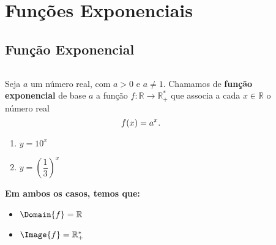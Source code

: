 \section{Funções Exponenciais}

\subsection{Função Exponencial}
\begin{frame}
  \begin{columns}[onlytextwidth]
    \begin{column}{0.49\textwidth}\vspace*{-0.5cm}
      \begin{definition}
        Seja $a$ um número real, com $a > 0$ e $a\not= 1$. Chamamos de \textbf{função exponencial} de base $a$ a função $f:\mathbb{R}\rightarrow\mathbb{R}_{+}^{*}$ que associa a cada $x\in\mathbb{R}$ o número real\vspace*{-0.2cm}
        \begin{equation*}
          f(x) = a^{x}.\vspace*{-0.2cm}
        \end{equation*}
      \end{definition}
      \begin{example-highlight}
        \begin{enumerate}
          \item $y = 10^{x}$
          \item<2> $y = \left( \dfrac{1}{3} \right)^{x}$
        \end{enumerate}
      \end{example-highlight}
      \begin{highlight}
        \textbf{Em ambos os casos, temos que:}
        \begin{itemize}
          \item $\Domain{f} = \mathbb{R}$
          \item $\Image{f} = \mathbb{R}_{+}^{*}$
        \end{itemize}
      \end{highlight}
    \end{column}
    \begin{column}{0.49\textwidth}\vspace*{-0.8cm}
      \begin{figure}
      \end{figure}
    \end{column}
  \end{columns}
\end{frame}

\begin{frame}[c]
  \begin{figure}
  \end{figure}
\end{frame}

\begin{frame}[c]
  \begin{figure}
  \end{figure}
\end{frame}